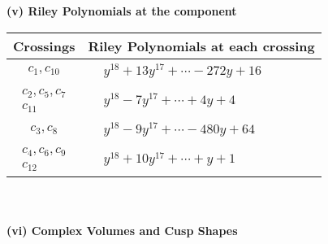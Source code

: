 \documentclass[1p]{elsarticle_modified}
\theoremstyle{definition}
\begin{document}
\newpage\renewcommand{\arraystretch}{1}
\flushleft \textbf{(v) Riley Polynomials at the component}\newline \\
\begin{tabular}{m{50pt}|m{274pt}}
Crossings & \hspace{64pt}Riley Polynomials at each crossing \\
\hline $$\begin{aligned}c_{1},c_{10}\end{aligned}$$&$\begin{aligned}
&y^{18}+13 y^{17}+\cdots-272 y+16
\end{aligned}$\\
\hline $$\begin{aligned}c_{2},c_{5},c_{7}\\c_{11}\end{aligned}$$&$\begin{aligned}
&y^{18}-7 y^{17}+\cdots+4 y+4
\end{aligned}$\\
\hline $$\begin{aligned}c_{3},c_{8}\end{aligned}$$&$\begin{aligned}
&y^{18}-9 y^{17}+\cdots-480 y+64
\end{aligned}$\\
\hline $$\begin{aligned}c_{4},c_{6},c_{9}\\c_{12}\end{aligned}$$&$\begin{aligned}
&y^{18}+10 y^{17}+\cdots+y+1
\end{aligned}$\\
\hline
\end{tabular}\\~\\
\newpage\flushleft \textbf{(vi) Complex Volumes and Cusp Shapes}
\end{document}
